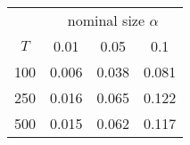 % 
\begin{tabular}{cccc}
  \hline
  & \multicolumn{3}{c}{nominal size $\alpha$} \\
 $T$ & 0.01 & 0.05 & 0.1 \\
 \hline
100 & 0.006 & 0.038 & 0.081 \\ 
  250 & 0.016 & 0.065 & 0.122 \\ 
  500 & 0.015 & 0.062 & 0.117 \\ 
   \hline
\end{tabular}
